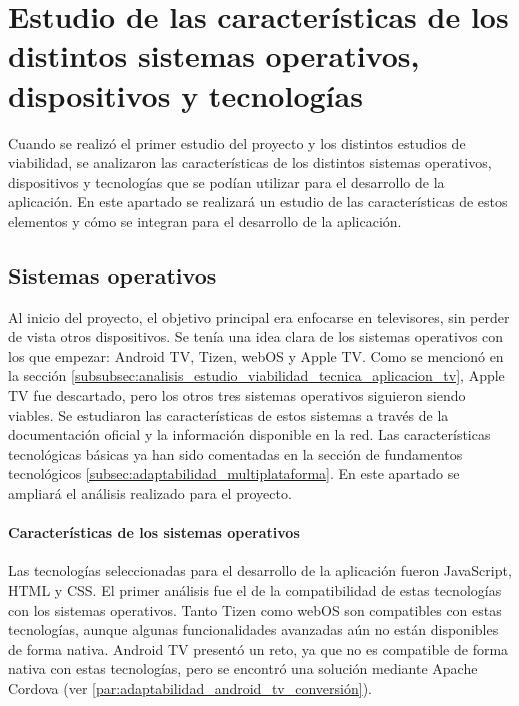 \section{Estudio de las características de los distintos sistemas operativos, dispositivos y tecnologías}
\label{sec:analisis_estudio}

Cuando se realizó el primer estudio del proyecto y los distintos estudios de viabilidad, se analizaron las 
características de los distintos sistemas operativos, dispositivos y tecnologías que se podían utilizar para
el desarrollo de la aplicación. En este apartado se realizará un estudio de las características de estos 
elementos y cómo se integran para el desarrollo de la aplicación.

\subsection{Sistemas operativos}
\label{subsec:analisis_estudio_sistemas_operativos}

Al inicio del proyecto, el objetivo principal era enfocarse en televisores, sin perder de vista otros dispositivos. 
Se tenía una idea clara de los sistemas operativos con los que empezar: Android TV, Tizen, webOS y Apple TV. Como 
se mencionó en la sección \ref{subsubsec:analisis_estudio_viabilidad_tecnica_aplicacion_tv}, Apple TV fue descartado, 
pero los otros tres sistemas operativos siguieron siendo viables. Se estudiaron las características de estos sistemas 
a través de la documentación oficial y la información disponible en la red. Las características tecnológicas básicas ya 
han sido comentadas en la sección de fundamentos tecnológicos \ref{subsec:adaptabilidad_multiplataforma}. En este apartado 
se ampliará el análisis realizado para el proyecto.

\paragraph{Características de los sistemas operativos}
\label{par:analisis_estudio_sistemas_operativos_caracteristicas}
Las tecnologías seleccionadas para el desarrollo de la aplicación fueron JavaScript, HTML y CSS. El primer análisis fue 
el de la compatibilidad de estas tecnologías con los sistemas operativos. Tanto Tizen como webOS son compatibles con estas tecnologías, 
aunque algunas funcionalidades avanzadas aún no están disponibles de forma nativa. Android TV presentó un reto, ya que no es compatible 
de forma nativa con estas tecnologías, pero se encontró una solución mediante Apache Cordova (ver \ref{par:adaptabilidad_android_tv_conversión}).

